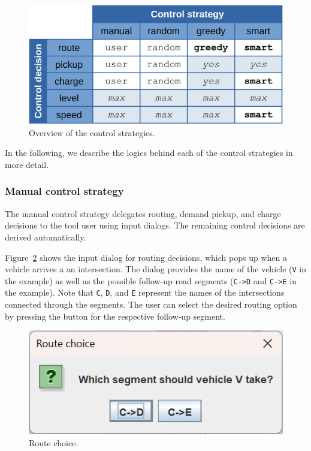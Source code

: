 \documentclass[a4paper,twoside]{article}
\begin{document}
	\begin{figure}[!ht]
		\centering
		\includegraphics[width=0.8\columnwidth]{control_strategy_overview.png}
		\caption{Overview of the control strategies.}
		\label{fig:control-strategies}
	\end{figure}
	
	In the following, we describe the logics behind each of the control strategies in more detail.
	
	\subsubsection*{Manual control strategy}
	\label{sec:controller-manual}
	
	The manual control strategy delegates routing, demand pickup, and charge decisions to the tool user using input dialogs.
	The remaining control decisions are derived automatically.
	
	Figure~\ref{fig:manual-controller-route} shows the input dialog for routing decisions, which pops up when a vehicle arrives a an intersection.
	The dialog provides the name of the vehicle (\texttt{V} in the example) as well as the possible follow-up road segments (\texttt{C->D} and \texttt{C->E} in the example).
	Note that \texttt{C}, \texttt{D}, and \texttt{E} represent the names of the intersections connected through the segments.
	The user can select the desired routing option by pressing the button for the respective follow-up segment.
	
	\begin{figure}[!ht]
		\centering
		\includegraphics[scale=0.4]{../../screenshots/manual-controller-route.png}
		\caption{Route choice.}
		\label{fig:manual-controller-route}
	\end{figure}
	
\end{document}
